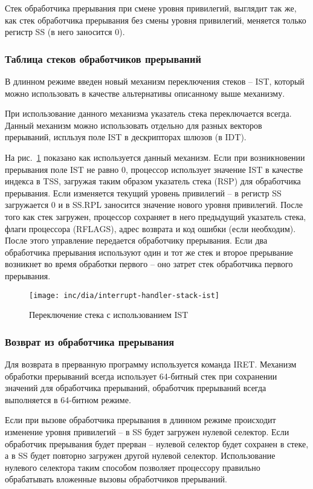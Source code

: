 Стек обработчика прерывания при смене уровня привилегий, выглядит так же, как
стек обработчика прерывания без смены уровня привилегий, меняется только
регистр SS (в него заносится 0).

\subsubsection*{Таблица стеков обработчиков прерываний}
В длинном режиме введен новый механизм переключения стеков -- IST, который
можно использовать в качестве альтернативы описанному выше механизму.

При использование данного механизма указатель стека переключается всегда. Данный механизм
можно использовать отдельно для разных векторов прерываний, испльзуя поле IST
в дескрипторах шлюзов (в IDT).

На рис.~\ref{fig:interrupt_handler_stack_ist} показано как используется данный
механизм. Если при возникновении прерывания поле IST не равно 0, процессор
использует значение IST в качестве индекса в TSS, загружая таким образом указатель стека
(RSP) для обработчика прерывания. Если изменяется текущий уровень привилегий
-- в регистр SS загружается 0 и в SS.RPL заносится значение нового уровня
привилегий. После того как стек загружен, процессор сохраняет в него предыдущий
указатель стека, флаги процессора (RFLAGS), адрес возврата и код ошибки (если
необходим). После этого управление передается обработчику прерывания. Если два
обработчика прерывания используют один и тот же стек и второе прерывание
возникнет во время обработки первого -- оно затрет стек обработчика первого прерывания.

\begin{figure}[ht!]
  \centering
  \texttt{[image: inc/dia/interrupt-handler-stack-ist]}
  \caption{Переключение стека с использованием IST}
  \label{fig:interrupt_handler_stack_ist}
\end{figure}

\subsubsection*{Возврат из обработчика прерывания}
Для возврата в прерванную программу используется команда IRET. Механизм
обработки прерываний всегда использует 64-битный стек при сохранении значений
для обработчика прерываний, обработчик прерываний всегда выполняется в
64-битном режиме.

Если при вызове обработчика прерывания в длинном режиме происходит изменение
уровня привилегий -- в SS будет загружен нулевой селектор. Если обработчик
прерывания будет прерван -- нулевой селектор будет сохранен в стеке, а в SS
будет повторно загружен другой нулевой селектор. Использование нулевого
селектора таким способом позволяет процессору правильно обрабатывать вложенные
вызовы обработчиков прерываний.

